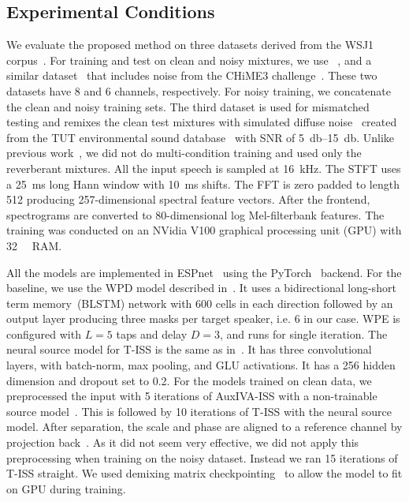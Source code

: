 \documentclass[a4paper]{article}
\begin{document}
\subsection{Experimental Conditions}

We evaluate the proposed method on three datasets derived from the WSJ1 corpus~\cite{wsj1}.
For training and test on clean and noisy mixtures, we use ~\cite{changMIMOSpeechEndtoendMultichannel2019}, and a similar dataset~\cite{scheiblerSurrogateSourceModel2021} that includes noise from the CHiME3 challenge~\cite{barkerThirdCHiMESpeech2015}.
These two datasets have 8 and 6 channels, respectively.
For noisy training, we concatenate the clean and noisy training sets.
The third dataset is used for mismatched testing and remixes the clean test mixtures with simulated diffuse noise~\cite{habetsGeneratingNonstationary2008} created from the TUT environmental sound database~\cite{Mesaros2018_DCASE} with SNR of \SIrange{5}{15}{\decibel}.
Unlike previous work~\cite{zhangEndtoEndFarFieldSpeech2020,zhangEndtoEndDereverberationBeamforming2021}, we did not do multi-condition training and used only the reverberant mixtures.
All the input speech is sampled at \SI{16}{\kilo\hertz}.
The STFT uses a \SI{25}{\milli\second} long Hann window with \SI{10}{\milli\second} shifts.
The FFT is zero padded to length \num{512} producing \num{257}-dimensional spectral feature vectors.
After the frontend, spectrograms are converted to 80-dimensional log Mel-filterbank features.
The training was conducted on an NVidia V100 graphical processing unit (GPU) with \SI{32}{\giga\byte} RAM.

All the models are implemented in ESPnet~\cite{Watanabe:2018gy} using the PyTorch~\cite{paszkePyTorchImperativeStyle2019} backend.
For the baseline, we use the WPD model described in~\cite{zhangEndtoEndFarFieldSpeech2020}.
It uses a bidirectional long-short term memory~(BLSTM) network with 600 cells in each direction followed by an output layer producing three masks per target speaker, i.e. 6 in our case.
WPE is configured with $L=5$ taps and delay $D=3$, and runs for single iteration.
%
The neural source model for T-ISS is the same as in~\cite{scheiblerSurrogateSourceModel2021}.
It has three convolutional layers, with batch-norm, max pooling, and GLU activations.
It has a 256 hidden dimension and dropout set to \num{0.2}.
For the models trained on clean data, we preprocessed the input with 5 iterations of AuxIVA-ISS with a non-trainable source model~\cite{scheiblerFastStableBlind2020}.
This is followed by 10 iterations of T-ISS with the neural source model.
After separation, the scale and phase are aligned to a reference channel by projection back~\cite{murataApproachBlindSource2001}.
As it did not seem very effective, we did not apply this preprocessing when training on the noisy dataset.
Instead we ran 15 iterations of T-ISS straight.
We used demixing matrix checkpointing~\cite{saijo_tiss_2021} to allow the model to fit on GPU during training.
\end{document}
